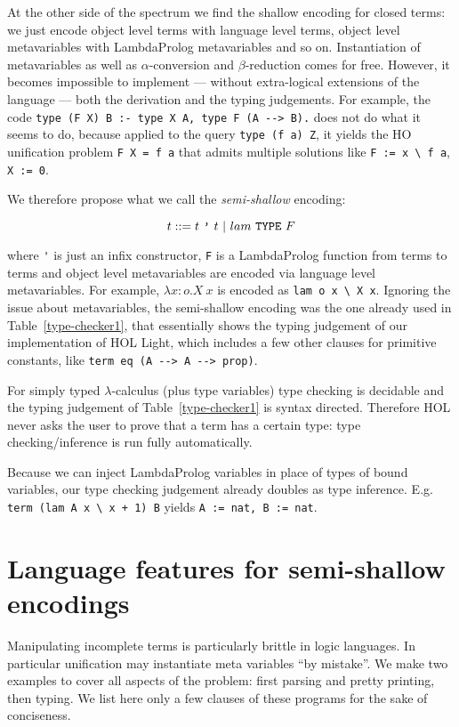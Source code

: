 \documentclass[preprint]{sigplanconf}
\begin{document}
At the other side of the spectrum we find the shallow encoding for closed terms: we just encode object level terms with language level terms, object level metavariables with LambdaProlog metavariables and so on. Instantiation of metavariables as well as $\alpha$-conversion and $\beta$-reduction comes for free. However, it becomes impossible to implement --- without extra-logical extensions of the language --- both the derivation and the typing judgements. For example, the code
{\small \verb+type (F X) B :- type X A, type F (A --> B).+} does not do what it seems to
do, because applied to the query \verb+type (f a) Z+, it yields the HO 
unification problem \verb+F X = f a+ that admits multiple solutions like
\verb+F := x \ f a+, \verb+X := 0+.

We therefore propose what we call the \emph{semi-shallow} encoding:

$$t ::= t~\verb+'+~t ~|~ lam~\mathtt{TYPE}~F$$

where \verb+'+ is just an infix constructor, \verb+F+ is a LambdaProlog function from terms to terms and object level metavariables are encoded via language level metavariables. For example, $\lambda x\!:\!o. X~x$ is encoded as
\verb+lam o x \ X x+. Ignoring the issue about metavariables, the semi-shallow encoding was the one already used in Table~\ref{type-checker1}, that essentially shows the typing judgement of our implementation of HOL Light, which includes a few other clauses for primitive constants, like \verb+term eq (A --> A --> prop)+.

For simply typed $\lambda$-calculus (plus type variables) type checking is decidable and the typing judgement of Table~\ref{type-checker1} is syntax directed. Therefore HOL never asks the user to prove that a term has a certain type: type checking/inference is run fully automatically.

Because we can inject LambdaProlog variables in place of types of bound variables, our type checking judgement already doubles as type inference. E.g. \verb/term (lam A x \ x + 1) B/ yields \verb+A := nat, B := nat+.

\section{Language features for semi-shallow encodings}
\label{cholp}

Manipulating incomplete terms is particularly brittle in logic languages.
In particular unification may instantiate meta variables ``by mistake''.
We make two examples to cover all aspects of the problem: first parsing and pretty printing,
then typing.  We list here only a few clauses of these programs for the sake of conciseness.
\end{document}
